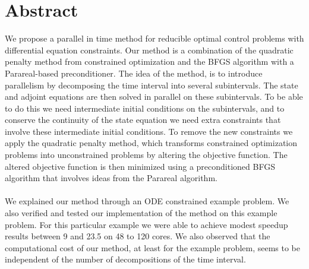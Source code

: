 \chapter*{Abstract}
We propose a parallel in time method for reducible optimal control problems with differential equation constraints. Our method is a combination of the quadratic penalty method from constrained optimization and the BFGS algorithm with a Parareal-based preconditioner. The idea of the method, is to introduce parallelism by decomposing the time interval into several subintervals. The state and adjoint equations are then solved in parallel on these subintervals. To be able to do this we need intermediate initial conditions on the subintervals, and to conserve the continuity of the state equation we need extra constraints that involve these intermediate initial conditions. To remove the new constraints we apply the quadratic penalty method, which transforms constrained optimization problems into unconstrained problems by altering the objective function. The altered objective function is then minimized using a preconditioned BFGS algorithm that involves ideas from the Parareal algorithm.
\\
\\
We explained our method through an ODE constrained example problem. We also verified and tested our implementation of the method on this example problem. For this particular example we were able to achieve modest speedup results between 9 and 23.5 on 48 to 120 cores. We also observed that the computational cost of our method, at least for the example problem, seems to be independent of the number of decompositions of the time interval.

